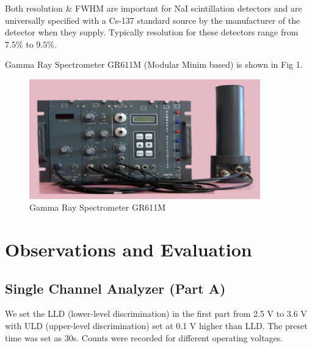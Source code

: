 \documentclass[%
 reprint,
nofootinbib,
 amsmath,amssymb,
 aps,
floatfix,
]{revtex4-2}
\begin{document}
Both resolution \& FWHM are important for NaI scintillation detectors and are universally specified with a Cs-137 standard source by the manufacturer of the detector when they supply. Typically resolution for these detectors range from $7.5 \%$ to $9.5 \%$.

 Gamma Ray Spectrometer GR611M (Modular Minim based) is shown in Fig 1.
\begin{figure}[H]
    \centering
    \includegraphics[angle=0,width=10cm]{Figures/spectrometer.png}
    \caption{Gamma Ray Spectrometer GR611M}
    \label{Table.1.}
\end{figure}

\section{Observations and Evaluation}
\subsection{Single Channel Analyzer (Part A)}
We set the LLD (lower-level discrimination) in the first part from 2.5 V to 3.6 V with ULD (upper-level discrimination) set at 0.1 V higher than LLD. The preset time was set as 30s. Counts were recorded for different operating voltages.
\end{document}
